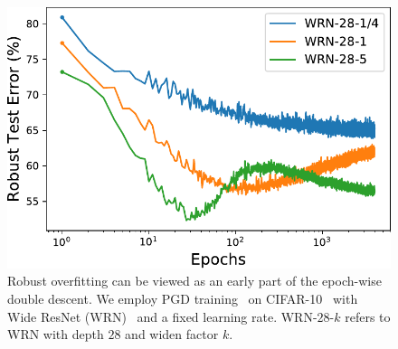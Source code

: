 \begin{figure} %
  \centering
  \includegraphics[width=1.0\linewidth]{figures/intro.pdf}
  \caption{Robust overfitting can be viewed as an early part of the epoch-wise double descent. 
  We employ PGD training~\citep{Madry2018TowardsDL} on CIFAR-10~\citep{Krizhevsky2009LearningML} with Wide ResNet (WRN)~\citep{Zagoruyko2016WideRN} and a fixed learning rate. 
  WRN-$28$-$k$ refers to WRN with depth $28$ and widen factor $k$.
  }
\label{fig:intro}
\vspace{-3mm}
\end{figure}


